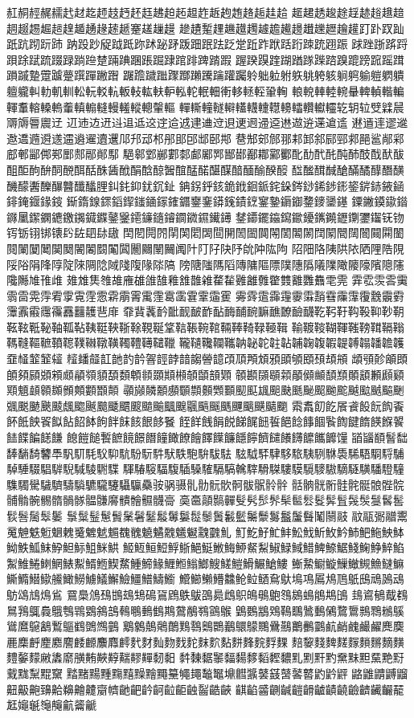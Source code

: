 䞑䞒䞓䞔䞕䞖䞗䞘䞙䞚䞛䞜䞝䞞䞟䞠䞡䞢䞣䞤䞥䞦䞧䞨䞩
䞪䞫䞬䞭䞮䞯䞰䞱䞲䞳䞴䞵䞶䞷䞸䞹䞺䞻䞼䞽䞾䞿䟀䟁䟂
䟃䟄䟅䟆䟇䟈䟉䟊䟋䟌䟍䟎䟏䟐䟑䟒䟓䟔䟕䟖䟗䟘䟙䟚䟛
䟜䟝䟞䟟䟠䟡䟢䟣䟤䟥䟦䟧䟨䟩䟪䟫䟬䟭䟮䟯䟰䟱䟲䟳䟴
䟵䟶䟷䟸䟹䟺䟻䟼䟽䟾䟿䠀䠁䠂䠃䠄䠅䠆䠇䠈䠉䠊䠋䠌䠍
䠎䠏䠐䠑䠒䠓䠔䠕䠖䠗䠘䠙䠚䠛䠜䠝䠞䠟䠠䠡䠢䠣䠤䠥䠦
䠧䠨䠩䠪䠫䠬䠭䠮䠯䠰䠱䠲䠳䠴䠵䠶䠷䠸䠹䠺䠻䠼䠽䠾䠿
䡀䡁䡂䡃䡄䡅䡆䡇䡈䡉䡊䡋䡌䡍䡎䡏䡐䡑䡒䡓䡔䡕䡖䡗䡘
䡙䡚䡛䡜䡝䡞䡟䡠䡡䡢䡣䡤䡥䡦䡧䡨䡩䡪䡫䡬䡭䡮䡯䡰䡱
䡲䡳䡴䡵䡶䡷䡸䡹䡺䡻䡼䡽䡾䡿䢀䢁䢂䢃䢄䢅䢆䢇䢈䢉䢊
䢋䢌䢍䢎䢏䢐䢑䢒䢓䢔䢕䢖䢗䢘䢙䢚䢛䢜䢝䢞䢟䢠䢡䢢䢣
䢤䢥䢦䢧䢨䢩䢪䢫䢬䢭䢮䢯䢰䢱䢲䢳䢴䢵䢶䢷䢸䢹䢺䢻䢼
䢽䢾䢿䣀䣁䣂䣃䣄䣅䣆䣇䣈䣉䣊䣋䣌䣍䣎䣏䣐䣑䣒䣓䣔䣕
䣖䣗䣘䣙䣚䣛䣜䣝䣞䣟䣠䣡䣢䣣䣤䣥䣦䣧䣨䣩䣪䣫䣬䣭䣮
䣯䣰䣱䣲䣳䣴䣵䣶䣷䣸䣹䣺䣻䣼䣽䣾䣿䤀䤁䤂䤃䤄䤅䤆䤇
䤈䤉䤊䤋䤌䤍䤎䤏䤐䤑䤒䤓䤔䤕䤖䤗䤘䤙䤚䤛䤜䤝䤞䤟䤠
䤡䤢䤣䤤䤥䤦䤧䤨䤩䤪䤫䤬䤭䤮䤯䤰䤱䤲䤳䤴䤵䤶䤷䤸䤹
䤺䤻䤼䤽䤾䤿䥀䥁䥂䥃䥄䥅䥆䥈䥉䥊䥋䥌䥍䥎䥏䥐䥑䥒䥓
䥔䥕䥖䥗䥘䥙䥚䥛䥜䥝䥞䥟䥠䥡䥢䥣䥤䥥䥦䥧䥨䥩䥪䥫䥬
䥭䥮䥯䥰䥱䥲䥳䥴䥵䥶䥷䥸䥹䥻䥼䥾䥿䦀䦁䦄䦇䦈䦉䦊䦋
䦌䦍䦎䦏䦐䦑䦒䦓䦔䦕䦖䦗䦘䦙䦚䦜䦝䦞䦠䦡䦢䦣䦤䦥䦦
䦧䦨䦩䦪䦫䦬䦭䦮䦯䦰䦱䦲䦳䦴䦵䦸䦹䦺䦻䦼䦽䦾䦿䧀䧁
䧂䧃䧄䧅䧆䧇䧈䧉䧊䧋䧌䧍䧎䧏䧐䧑䧒䧓䧔䧕䧖䧗䧘䧙䧚
䧛䧜䧝䧞䧟䧠䧡䧢䧣䧤䧥䧦䧧䧨䧩䧪䧫䧬䧭䧮䧯䧰䧱䧲䧳
䧴䧵䧶䧷䧸䧹䧺䧻䧼䧽䧾䧿䨀䨁䨂䨃䨄䨅䨆䨇䨈䨉䨊䨋䨌
䨍䨎䨏䨐䨑䨒䨓䨔䨕䨖䨗䨘䨙䨚䨛䨜䨝䨞䨟䨠䨡䨢䨣䨤䨥
䨦䨧䨨䨩䨪䨫䨬䨭䨮䨯䨰䨱䨲䨳䨴䨵䨶䨷䨸䨹䨺䨻䨼䨽䨾
䨿䩀䩁䩂䩃䩄䩅䩆䩇䩈䩉䩊䩋䩌䩍䩎䩏䩐䩑䩒䩓䩔䩕䩖䩗
䩘䩙䩚䩛䩜䩝䩞䩟䩠䩡䩢䩣䩤䩥䩦䩧䩨䩩䩪䩫䩬䩭䩮䩯䩰
䩱䩲䩳䩴䩵䩶䩷䩸䩹䩺䩻䩼䩽䩾䩿䪀䪁䪂䪃䪄䪅䪆䪇䪈䪉
䪊䪋䪌䪍䪎䪏䪐䪑䪒䪓䪔䪕䪖䪗䪘䪙䪚䪛䪜䪝䪞䪟䪠䪡䪢
䪣䪤䪥䪦䪧䪨䪩䪪䪫䪬䪭䪮䪯䪰䪱䪲䪳䪴䪵䪶䪷䪸䪹䪺䪻
䪼䪽䪾䪿䫀䫁䫂䫃䫄䫅䫆䫇䫈䫉䫊䫋䫌䫍䫎䫏䫐䫑䫒䫓䫔
䫕䫖䫗䫘䫙䫚䫛䫜䫝䫞䫟䫠䫡䫢䫣䫤䫥䫦䫧䫨䫩䫪䫫䫬䫭
䫮䫯䫰䫱䫲䫳䫴䫵䫶䫷䫸䫹䫺䫻䫼䫽䫾䫿䬀䬁䬂䬃䬄䬅䬆
䬇䬈䬉䬊䬋䬌䬍䬎䬏䬐䬑䬒䬓䬔䬕䬖䬗䬘䬙䬚䬛䬜䬝䬞䬟
䬠䬡䬢䬣䬤䬥䬦䬧䬨䬩䬪䬫䬬䬭䬮䬯䬰䬱䬲䬳䬴䬵䬶䬷䬸
䬹䬺䬻䬼䬽䬾䬿䭀䭁䭂䭃䭄䭅䭆䭇䭈䭉䭊䭋䭌䭍䭎䭏䭐䭑
䭒䭓䭔䭕䭖䭗䭘䭙䭚䭛䭜䭝䭞䭟䭠䭡䭢䭣䭤䭥䭦䭧䭨䭩䭪
䭫䭬䭭䭮䭯䭰䭱䭲䭳䭴䭵䭶䭷䭸䭹䭺䭻䭼䭽䭾䭿䮀䮁䮂䮃
䮄䮅䮆䮇䮈䮉䮊䮋䮌䮍䮎䮏䮐䮑䮒䮓䮔䮕䮖䮗䮘䮙䮚䮛䮜
䮝䮞䮟䮠䮡䮢䮣䮤䮥䮦䮧䮨䮩䮪䮫䮬䮭䮮䮯䮰䮱䮲䮳䮴䮵
䮶䮷䮸䮹䮺䮻䮼䮽䮾䮿䯀䯁䯂䯃䯄䯅䯆䯇䯈䯉䯊䯋䯌䯍䯎
䯏䯐䯑䯒䯓䯔䯕䯖䯗䯘䯙䯚䯛䯜䯝䯞䯟䯠䯡䯢䯣䯤䯥䯦䯧
䯨䯩䯪䯫䯬䯭䯮䯯䯰䯱䯲䯳䯴䯵䯶䯷䯸䯹䯺䯻䯼䯽䯾䯿䰀
䰁䰂䰃䰄䰅䰆䰇䰈䰉䰊䰋䰌䰍䰎䰏䰐䰑䰒䰓䰔䰕䰖䰗䰘䰙
䰚䰛䰜䰝䰞䰟䰠䰡䰢䰣䰤䰥䰦䰧䰨䰩䰪䰫䰬䰭䰮䰯䰰䰱䰲
䰳䰴䰵䰶䰷䰸䰹䰺䰻䰼䰽䰾䰿䱀䱁䱂䱃䱄䱅䱆䱇䱈䱉䱊䱋
䱌䱍䱎䱏䱐䱑䱒䱓䱔䱕䱖䱗䱘䱙䱚䱛䱜䱝䱞䱟䱠䱡䱢䱣䱤
䱥䱦䱧䱨䱩䱪䱫䱬䱭䱮䱯䱰䱱䱲䱳䱴䱵䱶䱸䱹䱺䱻䱼䱽䱾
䱿䲀䲁䲂䲃䲄䲅䲆䲇䲈䲉䲊䲋䲌䲍䲎䲏䲐䲑䲒䲓䲔䲕䲖䲗
䲘䲙䲚䲛䲜䲝䲞䲤䲥䲦䲧䲨䲩䲪䲫䲬䲭䲮䲯䲰䲱䲲䲳䲴䲵
䲶䲷䲸䲹䲺䲻䲼䲽䲾䲿䳀䳁䳂䳃䳄䳅䳆䳇䳈䳉䳊䳋䳌䳍䳎
䳏䳐䳑䳒䳓䳔䳕䳖䳗䳘䳙䳚䳛䳜䳝䳞䳟䳠䳡䳢䳣䳤䳥䳦䳧
䳨䳩䳪䳫䳬䳭䳮䳯䳰䳱䳲䳳䳴䳵䳶䳷䳸䳹䳺䳻䳼䳽䳾䳿䴀
䴁䴂䴃䴄䴅䴆䴇䴈䴉䴊䴋䴌䴍䴎䴏䴐䴑䴒䴚䴛䴜䴝䴞䴟䴠
䴡䴢䴣䴤䴥䴦䴧䴨䴩䴪䴫䴬䴭䴮䴯䴰䴱䴲䴳䴴䴵䴶䴷䴸䴹
䴺䴻䴼䴽䴾䴿䵀䵁䵂䵃䵄䵅䵆䵇䵈䵉䵊䵋䵌䵍䵎䵏䵐䵑䵒
䵓䵔䵕䵖䵗䵘䵙䵚䵛䵜䵝䵞䵟䵠䵡䵢䵣䵤䵥䵦䵧䵨䵩䵪䵫
䵬䵭䵮䵯䵰䵱䵲䵳䵴䵵䵶䵷䵸䵹䵺䵻䵼䵽䵾䵿䶀䶁䶂䶃䶄
䶅䶆䶇䶈䶉䶊䶋䶌䶍䶎䶏䶐䶑䶒䶓䶔䶕䶖䶗䶘䶙䶚䶛䶜䶝
䶞䶟䶠䶡䶢䶣䶤䶥䶦䶧䶨䶩䶪䶫䶬䶭䶯䶰䶱䶲䶳䶴䶵


